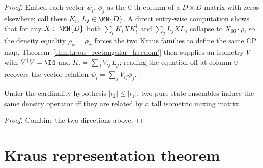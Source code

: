 \begin{proof}
    \leanok
    Embed each vector $\psi_i$, $\phi_j$ as the $0$-th column of a
    $D \times D$ matrix with zeros elsewhere; call these
    $K_i$, $L_j \in \MN{D}$. A direct entry-wise computation
    shows that for any $X \in \MN{D}$ both
    $\sum_i K_i X K_i^\dagger$ and $\sum_j L_j X L_j^\dagger$ collapse
    to $X_{00} \cdot \rho$, so the density equality
    $\rho_\psi = \rho_\phi$ forces the two Kraus families to define the
    same CP map. Theorem~\ref{thm:kraus_rectangular_freedom'} then supplies an
    isometry $V$ with $V^\dagger V = \Id$ and
    $K_i = \sum_j V_{ij}\,L_j$; reading the equation off at column $0$
    recovers the vector relation
    $\psi_i = \sum_j V_{ij} \phi_j$.
\end{proof}

\begin{theorem}
    \label{thm:pureEnsembleDensity_eq_iff_exists_isometric_mixing}
    \leanok
    Under the cardinality hypothesis $|\iota_2| \le |\iota_1|$, two
    pure-state ensembles induce the same density operator iff they are
    related by a tall isometric mixing matrix.
\end{theorem}

\begin{proof}
    \leanok
    Combine the two directions above.
\end{proof}

\section{Kraus representation theorem}
\label{sec:kraus_representation}

